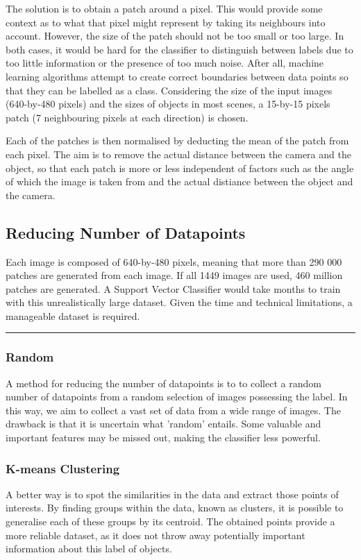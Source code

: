 \documentclass[dissertation.tex]{subfiles}
\begin{document}
The solution is to obtain a patch around a pixel. This would provide some context as to what that pixel might represent by taking its neighbours into account. However, the size of the patch should not be too small or too large. In both cases, it would be hard for the classifier to distinguish between labels due to too little information or the presence of too much noise. After all, machine learning algorithms attempt to create correct boundaries between data points so that they can be labelled as a class. Considering the size of the input images (640-by-480 pixels) and the sizes of objects in most scenes, a 15-by-15 pixels patch (7 neighbouring pixels at each direction) is chosen.


Each of the patches is then normalised by deducting the mean of the patch from each pixel. The aim is to remove the actual distance between the camera and the object, so that each patch is more or less independent of factors such as the angle of which the image is taken from and the actual distiance between the object and the camera. 



\subsection{Reducing Number of Datapoints}
Each image is composed of 640-by-480 pixels, meaning that more than 290 000 patches are generated from each image. If all 1449 images are used, 460 million patches are generated. A Support Vector Classifier would take months to train with this unrealistically large dataset. Given the time and technical limitations, a manageable dataset is required. 


\rule{200pt}{1pt}
\subsubsection{Random}
A method for reducing the number of datapoints is to to collect a random number of datapoints from a random selection of images possessing the label. In this way, we aim to collect a vast set of data from a wide range of images. The drawback is that it is uncertain what 'random' entails. Some valuable and important features may be missed out, making the classifier less powerful.

\subsubsection{K-means Clustering}
A better way is to spot the similarities in the data and extract those points of interests. By finding groups within the data, known as clusters, it is possible to generalise each of these groups by its centroid. The obtained points provide a more reliable dataset, as it does not throw away potentially important information about this label of objects.
\end{document}
